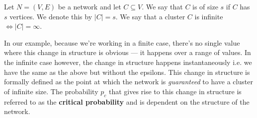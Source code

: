 \begin{definition}\label{def:cluster size}
  Let $N = (V, E)$ be a network and let $C \subseteq V$. We say that $C$ is of size $s$ if $C$ has $s$ vertices. We denote this by $|C| = s$. We say that a cluster $C$ is infinite
  $\iff |C| = \infty$.
\end{definition}

In our example, because we're working in a finite case, there's no single value where this change in structure is obvious --- it happens over a range of values. In the infinite
case however, the change in structure happens instantaneously i.e. we have the same as the above but without the epsilons. This change in structure is formally defined as the
point at which the network is \textit{guaranteed} to have a cluster of infinite size. The probability $p_c$ that gives rise to this change in structure is referred to as the
\textbf{critical probability} and is dependent on the structure of the network.


